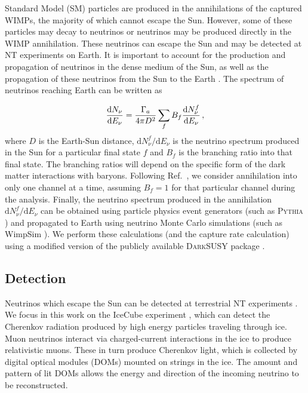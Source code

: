 Standard Model (SM) particles are produced in the annihilations of the captured WIMPs, the majority of which cannot escape the Sun. However, some of these particles may decay to neutrinos or neutrinos may be produced directly in the WIMP annihilation. These neutrinos can escape the Sun and may be detected at NT experiments on Earth. It is important to account for the production and propagation of neutrinos in the dense medium of the Sun, as well as the propagation of these neutrinos from the Sun to the Earth \cite{Blennow:2008}. The spectrum of neutrinos reaching Earth can be written as

\begin{equation}
\frac{\mathrm{d}N_\nu}{\mathrm{d}E_\nu} = \frac{\Gamma_a}{4\pi D^2}\sum_f B_f \frac{\mathrm{d}N_\nu^f}{\mathrm{d}E_\nu}\,,
\end{equation}
where $D$ is the Earth-Sun distance, $\mathrm{d}N_\nu^f/\mathrm{d}E_\nu$ is the neutrino spectrum produced in the Sun for a particular final state $f$ and $B_f$ is the branching ratio into that final state. The branching ratios will depend on the specific form of the dark matter interactions with baryons. Following Ref.~\cite{Arina:2013}, we consider annihilation into only one channel at a time, assuming $B_f = 1$ for that particular channel during the analysis. Finally, the neutrino spectrum produced in the annihilation $\mathrm{d}N_\nu^f/\mathrm{d}E_\nu$ can be obtained using particle physics event generators (such as \textsc{Pythia} \cite{Sjostrand:1994}) and propagated to Earth using neutrino Monte Carlo simulations (such as WimpSim \cite{Blennow:2008}). We perform these calculations (and the capture rate calculation) using a modified version of the publicly available \textsc{DarkSUSY} package \cite{Gondolo:2004,DarkSUSYweb}.



\subsection{Detection}

Neutrinos which escape the Sun can be detected at terrestrial NT experiments \cite{Adrian-Martinez:2013,Aartsen:2013b}. We focus in this work on the IceCube experiment \cite{Abbasi:2009,Aartsen:2013b}, which can detect the Cherenkov radiation produced by high energy particles traveling through ice. Muon neutrinos interact via charged-current interactions in the ice to produce relativistic muons. These in turn produce Cherenkov light, which is collected by digital optical modules (DOMs) mounted on strings in the ice. The amount and pattern of lit DOMs allows the energy and direction of the incoming neutrino to be reconstructed.

